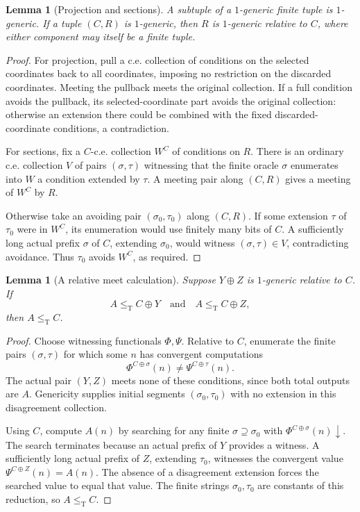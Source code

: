 \documentclass[11pt,a4paper]{article}
\newcommand{\leT}{\leq_{\mathrm T}}
\newtheorem{lemma}[theorem]{Lemma}
\theoremstyle{definition}\newtheorem{definition}[theorem]{Definition}
\theoremstyle{remark}\newtheorem{remark}[theorem]{Remark}
\begin{document}
\begin{lemma}[Projection and sections]\label{lem:sections}
A subtuple of a $1$-generic finite tuple is $1$-generic. If a tuple $(C,R)$ is $1$-generic, then $R$ is $1$-generic relative to $C$, where either component may itself be a finite tuple.
\end{lemma}
\begin{proof}
For projection, pull a c.e. collection of conditions on the selected coordinates back to all coordinates, imposing no restriction on the discarded coordinates. Meeting the pullback meets the original collection. If a full condition avoids the pullback, its selected-coordinate part avoids the original collection: otherwise an extension there could be combined with the fixed discarded-coordinate conditions, a contradiction.

For sections, fix a $C$-c.e. collection $W^C$ of conditions on $R$. There is an ordinary c.e. collection $V$ of pairs $(\sigma,\tau)$ witnessing that the finite oracle $\sigma$ enumerates into $W$ a condition extended by $\tau$. A meeting pair along $(C,R)$ gives a meeting of $W^C$ by $R$.

Otherwise take an avoiding pair $(\sigma_0,\tau_0)$ along $(C,R)$. If some extension $\tau$ of $\tau_0$ were in $W^C$, its enumeration would use finitely many bits of $C$. A sufficiently long actual prefix $\sigma$ of $C$, extending $\sigma_0$, would witness $(\sigma,\tau)\in V$, contradicting avoidance. Thus $\tau_0$ avoids $W^C$, as required.
\end{proof}

\begin{lemma}[A relative meet calculation]\label{lem:relative-meet}
Suppose $Y\oplus Z$ is $1$-generic relative to $C$. If
\[
                 A\leT C\oplus Y
                 \quad\text{and}\quad
                 A\leT C\oplus Z,
\]
then $A\leT C$.
\end{lemma}
\begin{proof}
Choose witnessing functionals $\Phi,\Psi$. Relative to $C$, enumerate the finite pairs $(\sigma,\tau)$ for which some $n$ has convergent computations
\[
             \Phi^{C\oplus\sigma}(n)\ne
             \Psi^{C\oplus\tau}(n).
\]
The actual pair $(Y,Z)$ meets none of these conditions, since both total outputs are $A$. Genericity supplies initial segments $(\sigma_0,\tau_0)$ with no extension in this disagreement collection.

Using $C$, compute $A(n)$ by searching for any finite $\sigma\supseteq\sigma_0$ with $\Phi^{C\oplus\sigma}(n)\downarrow$. The search terminates because an actual prefix of $Y$ provides a witness. A sufficiently long actual prefix of $Z$, extending $\tau_0$, witnesses the convergent value $\Psi^{C\oplus Z}(n)=A(n)$. The absence of a disagreement extension forces the searched value to equal that value. The finite strings $\sigma_0,\tau_0$ are constants of this reduction, so $A\leT C$.
\end{proof}
\end{document}
